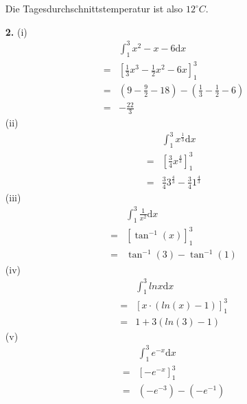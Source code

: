 \documentclass[a4paper,11pt]{article}
\begin{document}
\begin{enumerate}
            Die Tagesdurchschnittstemperatur ist also $12^{\circ}C$.
        \item[\textbf{2.}]
            \subitem(i)
                \begin{align*}
                    &&\int_1^3 x^2-x-6 \mathrm{d}x \\
                    &=&[\frac{1}{3}x^3-\frac{1}{2}x^2-6x]_1^3\\
                    &=&(9-\frac{9}{2}-18)-(\frac{1}{3}-\frac{1}{2}-6)\\
                    &=&-\frac{22}{3}
                \end{align*}
            \subitem(ii)
                \begin{align*}
                    &&\int_1^3 x^{\frac{1}{3}} \mathrm{d}x \\
                    &=&[\frac{3}{4}x^{\frac{4}{3}}]_1^3 \\
                    &=&\frac{3}{4}3^{\frac{4}{3}} - \frac{3}{4}1^{\frac{4}{3}}
                \end{align*}
            \subitem(iii)
                \begin{align*}
                    &&\int_1^3 \frac{1}{x^2} \mathrm{d}x \\
                    &=&[\tan^{-1}(x)]_1^3 \\
                    &=&\tan^{-1}(3) - \tan^{-1}(1)
                \end{align*}
            \subitem(iv)
                \begin{align*}
                    &&\int_1^3 ln x \mathrm{d}x \\
                    &=&[x \cdot (ln(x)-1)]_1^3 \\
                    &=&1+3(ln(3)-1)
                \end{align*}
            \subitem(v)
                \begin{align*}
                    &&\int_1^3 e^{-x} \mathrm{d}x \\
                    &=&[-e^{-x}]_1^3 \\
                    &=&(-e^{-3})-(-e^{-1})\\
                \end{align*}


\end{enumerate}
\end{document}
